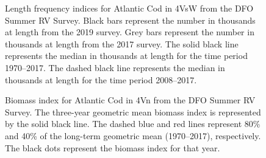 \documentclass[11pt]{book}
\begin{document}
\begin{figure}[htb]

{\centering {} 

}

\caption{Length frequency indices for Atlantic Cod in 4VsW from the DFO Summer RV Survey. Black bars represent the number in thousands at length from the 2019 survey. Grey bars represent the number in thousands at length from the 2017 survey. The solid black line represents the median in thousands at length for the time period 1970--2017. The dashed black line represents the median in thousands at length for the time period 2008--2017.}\label{fig:11-fig-cod-lengthfreq4VsW}
\end{figure}

\begin{figure}[htb]

{\centering {} 

}

\caption{Biomass index for Atlantic Cod in 4Vn from the DFO Summer RV Survey. The three-year geometric mean biomass index is represented by the solid black line. The dashed blue and red lines represent 80\% and 40\% of the long-term geometric mean (1970--2017), respectively. The black dots represent the biomass index for that year.}\label{fig:12-fig-cod-biomass4Vn}
\end{figure}
\end{document}
